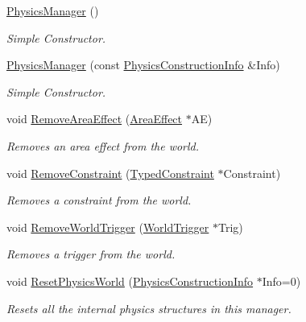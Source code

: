 \begin{DoxyCompactItemize}
\hyperlink{classphys_1_1PhysicsManager_ab3ecdc295799ad9858ca80743b25006d}{PhysicsManager} ()
\begin{DoxyCompactList}\small\item\em Simple Constructor. \item\end{DoxyCompactList}\item 
\hyperlink{classphys_1_1PhysicsManager_abb3bd1e6aaadba95ce219d9d3643ebfe}{PhysicsManager} (const \hyperlink{classphys_1_1PhysicsConstructionInfo}{PhysicsConstructionInfo} \&Info)
\begin{DoxyCompactList}\small\item\em Simple Constructor. \item\end{DoxyCompactList}\item 
void \hyperlink{classphys_1_1PhysicsManager_a5ee0f784a8239be56164a7a67a28f227}{RemoveAreaEffect} (\hyperlink{classphys_1_1AreaEffect}{AreaEffect} $\ast$AE)
\begin{DoxyCompactList}\small\item\em Removes an area effect from the world. \item\end{DoxyCompactList}\item 
void \hyperlink{classphys_1_1PhysicsManager_ace94aa20b5191b01630e7a5046cb7af6}{RemoveConstraint} (\hyperlink{classphys_1_1TypedConstraint}{TypedConstraint} $\ast$Constraint)
\begin{DoxyCompactList}\small\item\em Removes a constraint from the world. \item\end{DoxyCompactList}\item 
void \hyperlink{classphys_1_1PhysicsManager_a48bd725a1a2b3e8193b549a915ef4dc2}{RemoveWorldTrigger} (\hyperlink{classphys_1_1WorldTrigger}{WorldTrigger} $\ast$Trig)
\begin{DoxyCompactList}\small\item\em Removes a trigger from the world. \item\end{DoxyCompactList}\item 
void \hyperlink{classphys_1_1PhysicsManager_a22e76681b153c170dd6bfef2edbbbcd3}{ResetPhysicsWorld} (\hyperlink{classphys_1_1PhysicsConstructionInfo}{PhysicsConstructionInfo} $\ast$Info=0)
\begin{DoxyCompactList}\small\item\em Resets all the internal physics structures in this manager. \item\end{DoxyCompactList}\item 

\end{DoxyCompactItemize}
